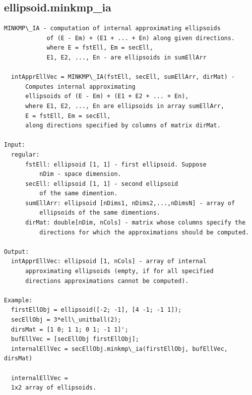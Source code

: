 \documentclass[letterpaper,10pt,english]{sphinxmanual}
\begin{document}
\subsection{ellipsoid.minkmp\_ia}
\label{chap_functions:ellipsoid-minkmp-ia}
\begin{Verbatim}[commandchars=\\\{\}]
MINKMP\_IA - computation of internal approximating ellipsoids
            of (E - Em) + (E1 + ... + En) along given directions.
            where E = fstEll, Em = secEll,
            E1, E2, ..., En - are ellipsoids in sumEllArr

  intApprEllVec = MINKMP\_IA(fstEll, secEll, sumEllArr, dirMat) -
      Computes internal approximating
      ellipsoids of (E - Em) + (E1 + E2 + ... + En),
      where E1, E2, ..., En are ellipsoids in array sumEllArr,
      E = fstEll, Em = secEll,
      along directions specified by columns of matrix dirMat.

Input:
  regular:
      fstEll: ellipsoid [1, 1] - first ellipsoid. Suppose
          nDim - space dimension.
      secEll: ellipsoid [1, 1] - second ellipsoid
          of the same dimention.
      sumEllArr: ellipsoid [nDims1, nDims2,...,nDimsN] - array of
          ellipsoids of the same dimentions.
      dirMat: double[nDim, nCols] - matrix whose columns specify the
          directions for which the approximations should be computed.

Output:
  intApprEllVec: ellipsoid [1, nCols] - array of internal
      approximating ellipsoids (empty, if for all specified
      directions approximations cannot be computed).

Example:
  firstEllObj = ellipsoid([-2; -1], [4 -1; -1 1]);
  secEllObj = 3*ell\_unitball(2);
  dirsMat = [1 0; 1 1; 0 1; -1 1]';
  bufEllVec = [secEllObj firstEllObj];
  internalEllVec = secEllObj.minkmp\_ia(firstEllObj, bufEllVec, dirsMat)

  internalEllVec =
  1x2 array of ellipsoids.
\end{Verbatim}
\end{document}

